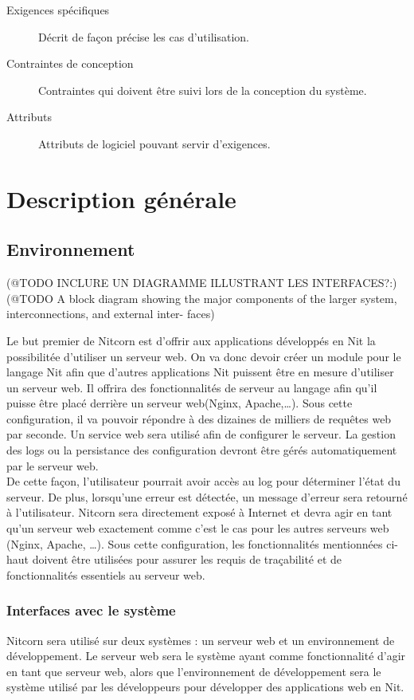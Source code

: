 \documentclass{scrreprt}
\begin{document}
\begin{description}
\item[Exigences spécifiques] Décrit de façon précise les cas d'utilisation.
\item[Contraintes de conception] Contraintes qui doivent être suivi lors de la conception du système.
\item[Attributs] Attributs de logiciel pouvant servir d'exigences. 
\end{description}
\chapter{Description générale}
\section{Environnement}
(@TODO INCLURE UN DIAGRAMME ILLUSTRANT LES INTERFACES?:)\\
(@TODO A block diagram showing the major components of the larger system, interconnections, and external inter-
faces)

Le but premier de Nitcorn est d'offrir aux applications développés en Nit la possibilitée
d'utiliser un serveur web. On va donc devoir créer un module pour le langage Nit afin que d'autres applications Nit puissent être en mesure d'utiliser un serveur web. Il offrira des fonctionnalités de serveur au langage afin qu'il puisse être placé derrière un serveur web(Nginx, Apache,\ldots). Sous cette configuration, il va pouvoir répondre à des dizaines de milliers de requêtes web par seconde. Un service web sera utilisé afin de configurer le serveur. La gestion des logs ou la persistance des configuration devront être gérés automatiquement par le serveur web.\\ De cette façon, l'utilisateur pourrait avoir accès au log pour déterminer l'état du serveur. De plus, lorsqu'une erreur est détectée, un message d'erreur sera retourné à l'utilisateur. Nitcorn sera directement exposé à Internet et devra agir en tant qu'un serveur web exactement comme c'est le cas pour les autres
serveurs web (Nginx, Apache, \ldots). Sous cette configuration, les
fonctionnalités mentionnées ci-haut doivent être utilisées pour assurer les requis de traçabilité
et de fonctionnalités essentiels au serveur web.

\subsection{Interfaces avec le système}
Nitcorn sera utilisé sur deux systèmes : un serveur web et un environnement de développement.
Le serveur web sera le système ayant comme fonctionnalité d'agir en tant que serveur web, alors
que l'environnement de développement sera le système utilisé par les développeurs
pour développer des applications web en Nit.\\
\end{document}
